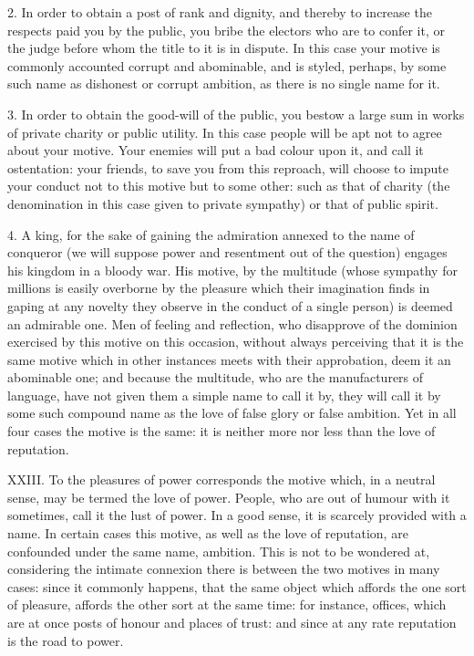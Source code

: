 \documentclass[12pt]{report}
\begin{document}
2. In order to obtain a post of rank and dignity, and thereby to
increase the respects paid you by the public, you bribe the electors who
are to confer it, or the judge before whom the title to it is in
dispute. In this case your motive is commonly accounted corrupt and
abominable, and is styled, perhaps, by some such name as dishonest or
corrupt ambition, as there is no single name for it.

3. In order to obtain the good-will of the public, you bestow a large
sum in works of private charity or public utility. In this case people
will be apt not to agree about your motive. Your enemies will put a bad
colour upon it, and call it ostentation: your friends, to save you from
this reproach, will choose to impute your conduct not to this motive but
to some other: such as that of charity (the denomination in this case
given to private sympathy) or that of public spirit.

4. A king, for the sake of gaining the admiration annexed to the name of
conqueror (we will suppose power and resentment out of the question)
engages his kingdom in a bloody war. His motive, by the multitude (whose
sympathy for millions is easily overborne by the pleasure which their
imagination finds in gaping at any novelty they observe in the conduct
of a single person) is deemed an admirable one. Men of feeling and
reflection, who disapprove of the dominion exercised by this motive on
this occasion, without always perceiving that it is the same motive
which in other instances meets with their approbation, deem it an
abominable one; and because the multitude, who are the manufacturers of
language, have not given them a simple name to call it by, they will
call it by some such compound name as the love of false glory or false
ambition. Yet in all four cases the motive is the same: it is neither
more nor less than the love of reputation.

XXIII. To the pleasures of power corresponds the motive which, in a
neutral sense, may be termed the love of power. People, who are out of
humour with it sometimes, call it the lust of power. In a good sense, it
is scarcely provided with a name. In certain cases this motive, as well
as the love of reputation, are confounded under the same name, ambition.
This is not to be wondered at, considering the intimate connexion there
is between the two motives in many cases: since it commonly happens,
that the same object which affords the one sort of pleasure, affords the
other sort at the same time: for instance, offices, which are at once
posts of honour and places of trust: and since at any rate reputation is
the road to power.
\end{document}
